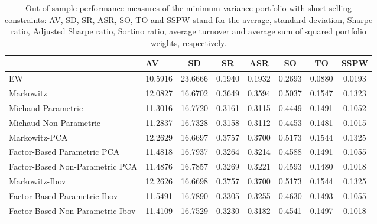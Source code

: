 \begin{table}

\caption{\label{tab:empirical_mvp}Out-of-sample performance measures of the minimum variance portfolio with short-selling constraints: AV, SD, SR, ASR, SO, TO and SSPW stand for the average, standard deviation, Sharpe ratio, Adjusted Sharpe ratio, Sortino ratio, average turnover and average sum of squared portfolio weights, respectively.}
\centering
\begin{tabular}[t]{l|l|c|c|c|c|c|c}
\hline
  & AV & SD & SR & ASR & SO & TO & SSPW\\
\hline
EW & 10.5916 & 23.6666 & 0.1940 & 0.1932 & 0.2693 & 0.0880 & 0.0193\\
\hline
Markowitz & 12.0827 & 16.6702 & 0.3649 & 0.3594 & 0.5037 & 0.1547 & 0.1323\\
\hline
Michaud Parametric & 11.3016 & 16.7720 & 0.3161 & 0.3115 & 0.4449 & 0.1491 & 0.1052\\
\hline
Michaud Non-Parametric & 11.2837 & 16.7328 & 0.3158 & 0.3112 & 0.4453 & 0.1481 & 0.1015\\
\hline
Markowitz-PCA & 12.2629 & 16.6697 & 0.3757 & 0.3700 & 0.5173 & 0.1544 & 0.1325\\
\hline
Factor-Based Parametric PCA & 11.4818 & 16.7937 & 0.3264 & 0.3214 & 0.4588 & 0.1491 & 0.1055\\
\hline
Factor-Based Non-Parametric PCA & 11.4876 & 16.7857 & 0.3269 & 0.3221 & 0.4593 & 0.1480 & 0.1018\\
\hline
Markowitz-Ibov & 12.2626 & 16.6698 & 0.3757 & 0.3700 & 0.5173 & 0.1544 & 0.1325\\
\hline
Factor-Based Parametric Ibov & 11.5491 & 16.7890 & 0.3305 & 0.3255 & 0.4630 & 0.1493 & 0.1055\\
\hline
Factor-Based Non-Parametric Ibov & 11.4109 & 16.7529 & 0.3230 & 0.3182 & 0.4541 & 0.1497 & 0.1018\\
\hline
\end{tabular}
\end{table}
